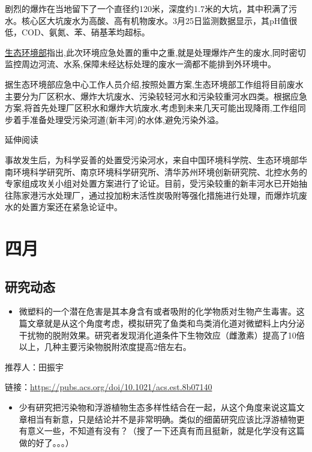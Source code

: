\documentclass[
]{book}
\providecommand{\tightlist}{%
  \setlength{\itemsep}{0pt}\setlength{\parskip}{0pt}}
\begin{document}
剧烈的爆炸在当地留下了一个直径约120米，深度约1.7米的大坑，其中积满了污水。核心区大坑废水为高酸、高有机物废水。3月25日监测数据显示，其pH值很低，COD、氨氮、苯、硝基苯均超标。

\href{http://legal.people.com.cn/n1/2019/0330/c42510-31004429.html}{生态环境部}指出,此次环境应急处置的重中之重,就是处理爆炸产生的废水,同时密切监控周边河流、水系,保障未经达标处理的废水一滴都不能排到外环境中。

据生态环境部应急中心工作人员介绍,按照处置方案,生态环境部工作组将目前废水主要分为厂区积水、爆炸大坑废水、污染较轻河水和污染较重河水四类。根据应急方案,将首先处理厂区积水和爆炸大坑废水,考虑到未来几天可能出现降雨,工作组同步着手准备处理受污染河道(新丰河)的水体,避免污染外溢。

延伸阅读

事故发生后，为科学妥善的处置受污染河水，来自中国环境科学院、生态环境部华南环境科学研究所、南京环境科学研究所、清华苏州环境创新研究院、北控水务的专家组成攻关小组对处置方案进行了论证。目前，受污染较重的新丰河水已开始抽往陈家港污水处理厂，通过投加粉末活性炭吸附等强化措施进行处理，而爆炸坑废水的处置方案还在紧急论证中。

\hypertarget{ux56dbux6708-1}{%
\section*{四月}\label{ux56dbux6708-1}}

\hypertarget{ux7814ux7a76ux52a8ux6001-17}{%
\subsection*{研究动态}\label{ux7814ux7a76ux52a8ux6001-17}}

\begin{itemize}
\tightlist
\item
  微塑料的一个潜在危害是其本身含有或者吸附的化学物质对生物产生毒害。这篇文章就是从这个角度考虑，模拟研究了鱼类和鸟类消化道对微塑料上内分泌干扰物的脱附效果。研究者发现消化道条件下生物效应（雌激素）提高了10倍以上，几种主要污染物脱附浓度提高2倍左右。
\end{itemize}

推荐人：田振宇

链接：\url{https://pubs.acs.org/doi/10.1021/acs.est.8b07140}

\begin{itemize}
\tightlist
\item
  少有研究把污染物和浮游植物生态多样性结合在一起，从这个角度来说这篇文章相当有新意，只是结论并不是非常明确。类似的细菌研究应该比浮游植物更有意义一些，不知道有没有？（搜了一下还真有而且挺新，就是化学没有这篇做的好了。。。）
\end{itemize}
\end{document}
